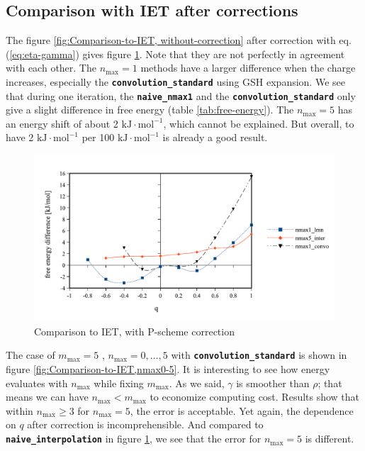 \subsection{Comparison with IET after corrections}

The figure \ref{fig:Comparison-to-IET, without-correction} after correction
with eq. (\ref{eq:eta-gamma}) gives figure \ref{fig:Comparison-to-IET, with-corr}.
Note that they are not perfectly in agreement with each other. The
$n_{\max}=1$ methods have a larger difference when the charge increases,
especially the \texttt{\textbf{convolution\_standard}} using GSH expansion.
We see that during one iteration, the \texttt{\textbf{naive\_nmax1}}
and the \texttt{\textbf{convolution\_standard}} only give a slight
difference in free energy (table \ref{tab:free-energy}). The $n_{\max}=5$
has an energy shift of about 2 $\mathrm{kJ}\cdot\mathrm{mol^{-1}}$,
which cannot be explained. But overall, to have 2 $\mathrm{kJ}\cdot\mathrm{mol^{-1}}$
per 100 $\mathrm{kJ}\cdot\mathrm{mol^{-1}}$ is already a good result.

\begin{figure}[H]
\begin{centering}
\includegraphics[bb=0bp 20bp 510bp 263bp,scale=0.6]{_figure/results/ch4_diff_inter}
\par\end{centering}
\caption{Comparison to IET, with P-scheme correction\label{fig:Comparison-to-IET, with-corr}}
\end{figure}

The case of $m_{\max}=5$ , $n_{\max}=0,\ldots,5$ with \texttt{\textbf{convolution\_standard}}
is shown in figure \ref{fig:Comparison-to-IET,nmax0-5}. It is interesting
to see how energy evaluates with $n_{\max}$ while fixing $m_{\max}$.
As we said, $\gamma$ is smoother than $\rho$; that means we can
have $n_{\max}<m_{\max}$ to economize computing cost. Results show
that within $n_{\max}\geq3$ for $n_{\max}=5$, the error is acceptable.
Yet again, the dependence on $q$ after correction is incomprehensible.
And compared to \texttt{\textbf{naive\_interpolation}} in figure \ref{fig:Comparison-to-IET, with-corr},
we see that the error for $n_{\max}=5$ is different.

